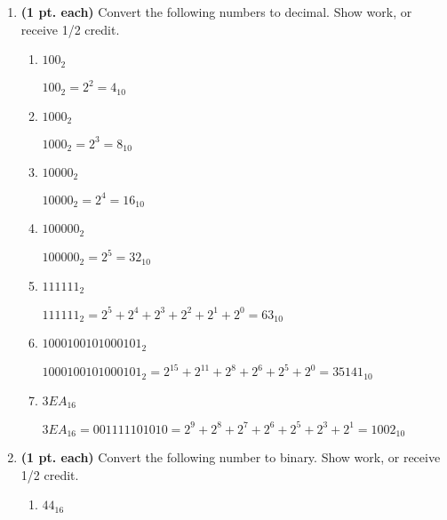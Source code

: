 \begin{enumerate}
\begin{enumerate}
	\item How should you prepare for the 43$^{rd}$ lecture?

	\begin{solution}{ Look over homework problem 8.10, page 165}\end{solution}
	\end{enumerate}

\item {\bf (1 pt. each)} Convert the following numbers to decimal. 
Show work, or receive 1/2 credit.
	\begin{enumerate}
	\item $100_2$

	\begin{solution}{ $100_2 = 2^2 = 4_{10}$}\end{solution}
	\item $1000_2$

	\begin{solution}{ $1000_2 = 2^3 = 8_{10}$}\end{solution}
	\item $10000_2$

	\begin{solution}{ $10000_2 = 2^4 = 16_{10}$}\end{solution}
	\item $100000_2$

	\begin{solution}{ $100000_2 = 2^5 = 32_{10}$}\end{solution}
	\item $111111_2$

	\begin{solution}{ $111111_2 = 2^5+2^4+2^3+2^2+2^1+2^0=63_{10}$}\end{solution}
	\item $1000100101000101_2$

	\begin{solution}{ $1000100101000101_2=2^{15}+2^{11}+2^8+2^6+2^5+2^0=35141_{10}$}\end{solution}
	\item $3EA_{16}$

	\begin{solution}{ $3EA_{16}=0011 1110 1010 = 2^9+2^8+2^7+2^6+2^5+2^3+2^1=1002_{10}$}\end{solution}
        \end{enumerate}


\item {\bf (1 pt. each)} Convert the following number to binary. Show 
work, or receive 1/2 credit.
	\begin{enumerate}
	\item $44_{16}$


\end{enumerate}
\end{enumerate}
